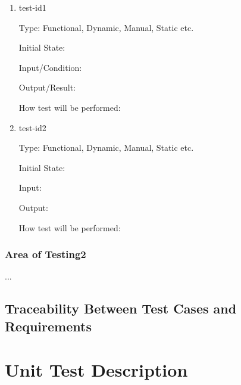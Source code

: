 \documentclass[12pt, titlepage]{article}
\newcommand{\tref}[1]{T\ref{#1}}
\newcommand{\rref}[1]{R\ref{#1}}
\begin{document}
\begin{enumerate}

\item{test-id1\\}

Type: Functional, Dynamic, Manual, Static etc.

Initial State:

Input/Condition:

Output/Result:

How test will be performed:

\item{test-id2\\}

Type: Functional, Dynamic, Manual, Static etc.

Initial State:

Input:

Output:

How test will be performed:

\end{enumerate}

\subsubsection{Area of Testing2}

...

\subsection{Traceability Between Test Cases and Requirements}



\section{Unit Test Description}
\label{sec:unit-test-descr}
\end{document}
